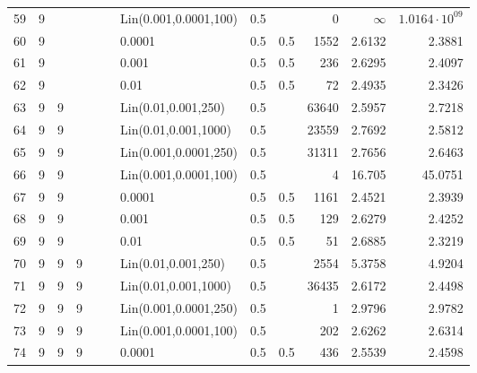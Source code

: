 \begin{longtable}{lrrrrrlrrrrr}
  59 &       9 &   &   &   &   & Lin(0.001,0.0001,100) &  0.5 &        &       0 &               $\infty$ & $1.0164\cdot 10^{09}$ \\
  60 &       9 &   &   &   &   &                0.0001 &  0.5 &    0.5 &    1552 &                 2.6132 &                2.3881 \\
  61 &       9 &   &   &   &   &                 0.001 &  0.5 &    0.5 &     236 &                 2.6295 &                2.4097 \\
  62 &       9 &   &   &   &   &                  0.01 &  0.5 &    0.5 &      72 &                 2.4935 &                2.3426 \\
  63 &       9 & 9 &   &   &   &   Lin(0.01,0.001,250) &  0.5 &        &   63640 &                 2.5957 &                2.7218 \\
  64 &       9 & 9 &   &   &   &  Lin(0.01,0.001,1000) &  0.5 &        &   23559 &                 2.7692 &                2.5812 \\
  65 &       9 & 9 &   &   &   & Lin(0.001,0.0001,250) &  0.5 &        &   31311 &                 2.7656 &                2.6463 \\
  66 &       9 & 9 &   &   &   & Lin(0.001,0.0001,100) &  0.5 &        &       4 &                 16.705 &               45.0751 \\
  67 &       9 & 9 &   &   &   &                0.0001 &  0.5 &    0.5 &    1161 &                 2.4521 &                2.3939 \\
  68 &       9 & 9 &   &   &   &                 0.001 &  0.5 &    0.5 &     129 &                 2.6279 &                2.4252 \\
  69 &       9 & 9 &   &   &   &                  0.01 &  0.5 &    0.5 &      51 &                 2.6885 &                2.3219 \\
  70 &       9 & 9 & 9 &   &   &   Lin(0.01,0.001,250) &  0.5 &        &    2554 &                 5.3758 &                4.9204 \\
  71 &       9 & 9 & 9 &   &   &  Lin(0.01,0.001,1000) &  0.5 &        &   36435 &                 2.6172 &                2.4498 \\
  72 &       9 & 9 & 9 &   &   & Lin(0.001,0.0001,250) &  0.5 &        &       1 &                 2.9796 &                2.9782 \\
  73 &       9 & 9 & 9 &   &   & Lin(0.001,0.0001,100) &  0.5 &        &     202 &                 2.6262 &                2.6314 \\
  74 &       9 & 9 & 9 &   &   &                0.0001 &  0.5 &    0.5 &     436 &                 2.5539 &                2.4598 \\

\end{longtable}
